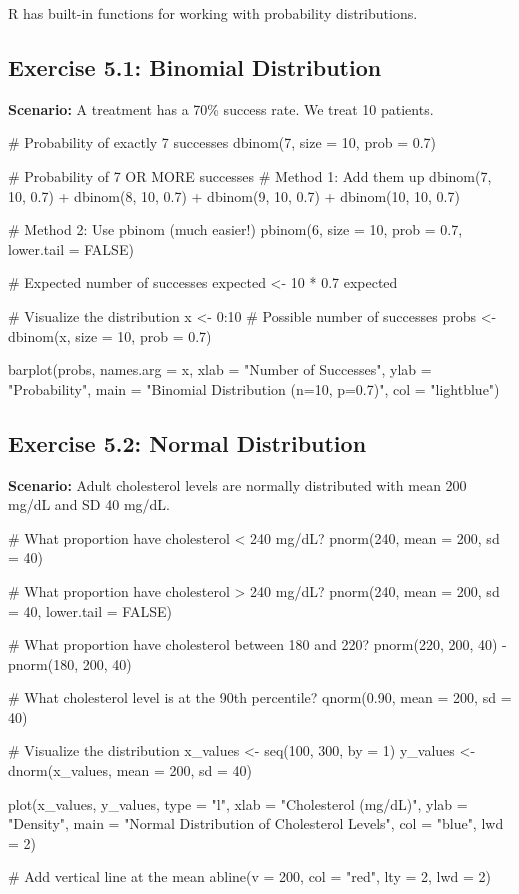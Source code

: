 \documentclass[11pt]{article}
\begin{document}
R has built-in functions for working with probability distributions.

\subsection{Exercise 5.1: Binomial Distribution}

\textbf{Scenario:} A treatment has a 70\% success rate. We treat 10 patients.

\begin{rcode}
# Probability of exactly 7 successes
dbinom(7, size = 10, prob = 0.7)

# Probability of 7 OR MORE successes
# Method 1: Add them up
dbinom(7, 10, 0.7) + dbinom(8, 10, 0.7) +
  dbinom(9, 10, 0.7) + dbinom(10, 10, 0.7)

# Method 2: Use pbinom (much easier!)
pbinom(6, size = 10, prob = 0.7, lower.tail = FALSE)

# Expected number of successes
expected <- 10 * 0.7
expected

# Visualize the distribution
x <- 0:10  # Possible number of successes
probs <- dbinom(x, size = 10, prob = 0.7)

barplot(probs,
        names.arg = x,
        xlab = "Number of Successes",
        ylab = "Probability",
        main = "Binomial Distribution (n=10, p=0.7)",
        col = "lightblue")
\end{rcode}

\subsection{Exercise 5.2: Normal Distribution}

\textbf{Scenario:} Adult cholesterol levels are normally distributed with mean 200 mg/dL and SD 40 mg/dL.

\begin{rcode}
# What proportion have cholesterol < 240 mg/dL?
pnorm(240, mean = 200, sd = 40)

# What proportion have cholesterol > 240 mg/dL?
pnorm(240, mean = 200, sd = 40, lower.tail = FALSE)

# What proportion have cholesterol between 180 and 220?
pnorm(220, 200, 40) - pnorm(180, 200, 40)

# What cholesterol level is at the 90th percentile?
qnorm(0.90, mean = 200, sd = 40)

# Visualize the distribution
x_values <- seq(100, 300, by = 1)
y_values <- dnorm(x_values, mean = 200, sd = 40)

plot(x_values, y_values,
     type = "l",
     xlab = "Cholesterol (mg/dL)",
     ylab = "Density",
     main = "Normal Distribution of Cholesterol Levels",
     col = "blue",
     lwd = 2)

# Add vertical line at the mean
abline(v = 200, col = "red", lty = 2, lwd = 2)
\end{rcode}
\end{document}
